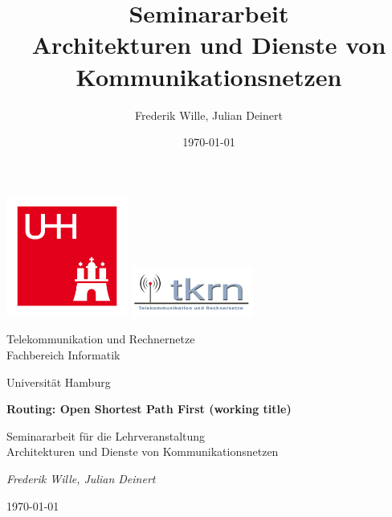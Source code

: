 \documentclass[11pt,a4paper,final]{article}
\title{\LARGE \bf
Seminararbeit\\ Architekturen und Dienste von Kommunikationsnetzen
}
\author{Frederik Wille, Julian Deinert}
\date{\today}
\begin{document}

\begin{titlepage}
	\centering
	\includegraphics[width=0.3\textwidth]{images/uhh_logo.jpg}\hspace{1cm}
	\includegraphics[width=0.3\textwidth]{images/tkrn_logo.jpg}\par
	{\Large Telekommunikation und Rechnernetze \\}
	{\large Fachbereich Informatik\\}
	{\large Universität Hamburg \par}
	\vspace{1.5cm}
	{\huge\bfseries Routing: Open Shortest Path First (working title)\par}
	\vspace{1.5cm}
	{\large Seminararbeit für die Lehrveranstaltung \\ \Large Architekturen und Dienste von Kommunikationsnetzen\par}

	\vfill
	\vfill
	{\Large\itshape Frederik Wille, Julian Deinert\par}

	\vfill

	{\large \today\par}
\end{titlepage}
\thispagestyle{empty}
\newpage
\thispagestyle{empty}
\tableofcontents
\newpage
\listoffigures
\thispagestyle{empty}
\newpage
\thispagestyle{empty}
\end{document}
